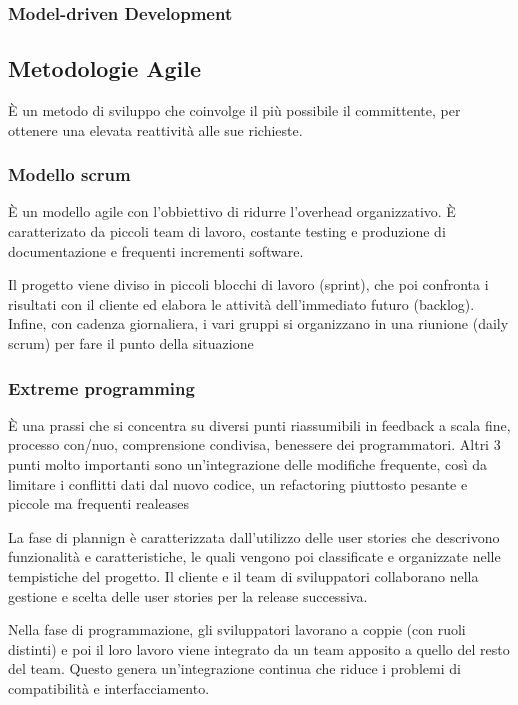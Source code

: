 \documentclass[12pt, a4paper]{article}
\begin{document}
\subsubsection{Model-driven Development}

\subsection{Metodologie Agile}
È un metodo di sviluppo che coinvolge il più possibile il committente, per ottenere una elevata reattività alle
sue richieste.

\subsubsection{Modello scrum}
È un modello agile con l'obbiettivo di ridurre l'overhead organizzativo. È caratterizato da piccoli team di lavoro,
costante testing e produzione di documentazione e frequenti incrementi software. 

Il progetto viene diviso in piccoli blocchi di lavoro (sprint), che poi confronta i risultati con il cliente ed 
elabora le attività dell'immediato futuro (backlog). Infine, con cadenza giornaliera, i vari gruppi si organizzano in 
una riunione (daily scrum) per fare il punto della situazione

\subsubsection{Extreme programming}
È una prassi che si concentra su diversi punti riassumibili in feedback a scala fine, processo con/nuo, comprensione
condivisa, benessere dei programmatori. Altri 3 punti molto importanti sono un'integrazione delle modifiche frequente,
così da limitare i conflitti dati dal nuovo codice, un refactoring piuttosto pesante e piccole ma frequenti realeases

La fase di plannign è caratterizzata dall'utilizzo delle user stories che descrivono funzionalità e caratteristiche,
le quali vengono poi classificate e organizzate nelle tempistiche del progetto. Il cliente e il team di sviluppatori
collaborano nella gestione e scelta delle user stories per la release successiva.

Nella fase di programmazione, gli sviluppatori lavorano a coppie (con ruoli distinti) e poi il loro lavoro viene
integrato da un team apposito a quello del resto del team. Questo genera un'integrazione continua che riduce i 
problemi di compatibilità e interfacciamento.
\end{document}
